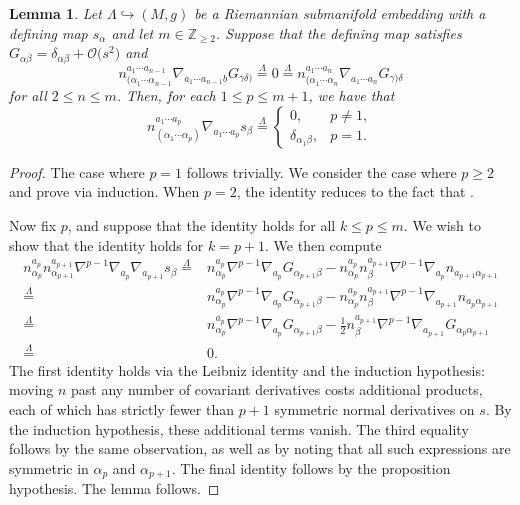 \documentclass[10pt,a4paper]{article}
\numberwithin{equation}{section}
\newtheorem{Lemma}[Theorem]{Lemma}
\renewcommand{\=}{\stackrel \Lambda =}
\newcommand{\csdot}{\hspace{-0.75mm} \cdot \hspace{-0.75mm}}
\begin{document}
\begin{Lemma} \label{normal-derivs-s}
Let $\Lambda \hookrightarrow (M,g)$ be a Riemannian submanifold embedding with a defining map $s_{\alpha}$ and let $m \in \mathbb{Z}_{\geq 2}$. Suppose that the defining map satisfies $G_{\alpha \beta} = \delta_{\alpha \beta} + \mathcal{O}\bigl(s^2\bigr)$ and
\[n^{a_1 \cdots a_{n-1}}_{(\alpha_1 \cdots \alpha_{n-1}} \nabla_{a_1 \cdots a_{n-1} b} G_{\gamma \delta)} \= 0 \= n^{a_1\cdots a_n}_{(\alpha_1 \cdots \alpha_n} \nabla_{a_1 \cdots a_n} G_{\gamma) \delta} \]
for all $2 \leq n \leq m$.
Then, for each $1 \leq p \leq m+1$, we have that
\[n^{a_1 \cdots a_p}_{(\alpha_1 \cdots \alpha_p)} \nabla_{a_1 \cdots a_p} s_{\beta} \= \begin{cases}
0, & p \neq 1, \\
\delta_{\alpha_1 \beta}, & p = 1 .
\end{cases}\]
\end{Lemma}
\begin{proof}
The case where $p=1$ follows trivially. We consider the case where $p \geq 2$ and prove via induction. When $p=2$, the identity reduces to the fact that \smash{$n \csdot \beta \= 0$}.

Now fix $p$, and suppose that the identity holds for all $k \leq p \leq m$. We wish to show that the identity holds for $k=p+1$. We then compute
\begin{align*}
 n^{a_{p}}_{\alpha_{p}} n^{a_{p+1}}_{\alpha_{p+1}} \nabla^{p-1} \nabla_{a_p} \nabla_{a_{p+1}} s_{\beta} \={}& n^{a_{p}}_{\alpha_{p}} \nabla^{p-1} \nabla_{a_{p}} G_{\alpha_{p+1} \beta} - n^{a_{p}}_{\alpha_{p}} n^{a_{p+1}}_{\beta} \nabla^{p-1} \nabla_{a_{p}} n_{a_{p+1} \alpha_{p+1}}\\
\={}& n^{a_{p}}_{\alpha_{p}} \nabla^{p-1} \nabla_{a_{p}} G_{\alpha_{p+1} \beta} -n^{a_{p}}_{\alpha_{p}} n^{a_{p+1}}_{\beta} \nabla^{p-1} \nabla_{a_{p+1}} n_{a_{p} \alpha_{p+1}}\\
\={}& n^{a_{p}}_{\alpha_{p}} \nabla^{p-1} \nabla_{a_{p}} G_{\alpha_{p+1} \beta} - \frac{1}{2} n^{a_{p+1}}_{\beta} \nabla^{p-1} \nabla_{a_{p+1}} G_{\alpha_{p} \alpha_{p+1}}\\
\={}& 0 .
\end{align*}
The first identity holds via the Leibniz identity and the induction hypothesis: moving $n$ past any number of covariant derivatives costs additional products, each of which has strictly fewer than $p+1$ symmetric normal derivatives on $s$. By the induction hypothesis, these additional terms vanish. The third equality follows by the same observation, as well as by noting that all such expressions are symmetric in $\alpha_{p}$ and $\alpha_{p+1}$. The final identity follows by the proposition hypothesis. The lemma follows.
\end{proof}
\end{document}
